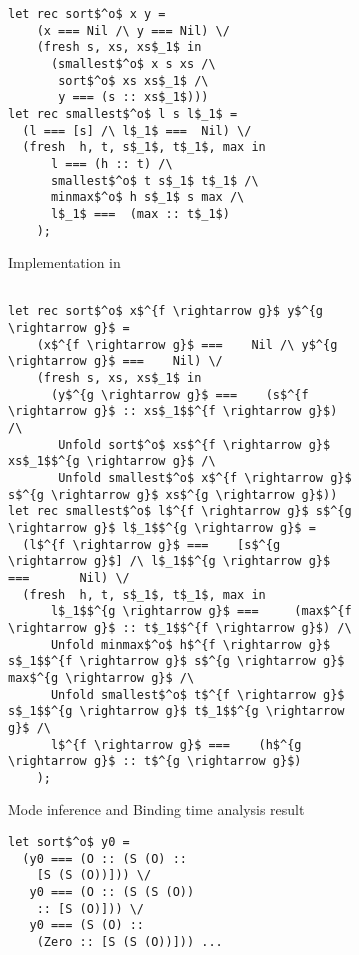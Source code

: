 \begin{figure}[!t]
  \centering
  \begin{subfigure}[b]{0.45\textwidth}
    \begin{lstlisting}[frame=tb, mathescape=true]
let rec sort$^o$ x y =
    (x === Nil /\ y === Nil) \/
    (fresh s, xs, xs$_1$ in
      (smallest$^o$ x s xs /\
       sort$^o$ xs xs$_1$ /\
       y === (s :: xs$_1$)))
let rec smallest$^o$ l s l$_1$ =
  (l === [s] /\ l$_1$ ===  Nil) \/
  (fresh  h, t, s$_1$, t$_1$, max in
      l === (h :: t) /\
      smallest$^o$ t s$_1$ t$_1$ /\
      minmax$^o$ h s$_1$ s max /\
      l$_1$ ===  (max :: t$_1$) 
    );
    \end{lstlisting}
   \caption{Implementation in \mk}
    \label{fig:sortIn}
  \end{subfigure}
  \hfill
  \begin{subfigure}[b]{0.45\textwidth}
    \begin{lstlisting}[frame=tb, mathescape=true]

let rec sort$^o$ x$^{f \rightarrow g}$ y$^{g \rightarrow g}$ =
    (x$^{f \rightarrow g}$ ===    Nil /\ y$^{g \rightarrow g}$ ===    Nil) \/
    (fresh s, xs, xs$_1$ in
      (y$^{g \rightarrow g}$ ===    (s$^{f \rightarrow g}$ :: xs$_1$$^{f \rightarrow g}$) /\
       Unfold sort$^o$ xs$^{f \rightarrow g}$ xs$_1$$^{g \rightarrow g}$ /\
       Unfold smallest$^o$ x$^{f \rightarrow g}$ s$^{g \rightarrow g}$ xs$^{g \rightarrow g}$))
let rec smallest$^o$ l$^{f \rightarrow g}$ s$^{g \rightarrow g}$ l$_1$$^{g \rightarrow g}$ =
  (l$^{f \rightarrow g}$ ===    [s$^{g \rightarrow g}$] /\ l$_1$$^{g \rightarrow g}$ ===       Nil) \/
  (fresh  h, t, s$_1$, t$_1$, max in
      l$_1$$^{g \rightarrow g}$ ===     (max$^{f \rightarrow g}$ :: t$_1$$^{f \rightarrow g}$) /\
      Unfold minmax$^o$ h$^{f \rightarrow g}$ s$_1$$^{f \rightarrow g}$ s$^{g \rightarrow g}$ max$^{g \rightarrow g}$ /\
      Unfold smallest$^o$ t$^{f \rightarrow g}$ s$_1$$^{g \rightarrow g}$ t$_1$$^{g \rightarrow g}$ /\
      l$^{f \rightarrow g}$ ===    (h$^{g \rightarrow g}$ :: t$^{g \rightarrow g}$) 
    );
    \end{lstlisting}
    \caption{Mode inference and Binding time analysis result}
    \label{fig:sortModded}
  \end{subfigure}

  \hfill

  \begin{subfigure}[b]{0.45\textwidth}
    \begin{lstlisting}[frame=tb, mathescape=true]
let sort$^o$ y0 =
  (y0 === (O :: (S (O) :: 
    [S (S (O))])) \/
   y0 === (O :: (S (S (O))
    :: [S (O)])) \/
   y0 === (S (O) :: 
    (Zero :: [S (S (O))])) ...
   

\end{lstlisting}
\end{subfigure}
\end{figure}
